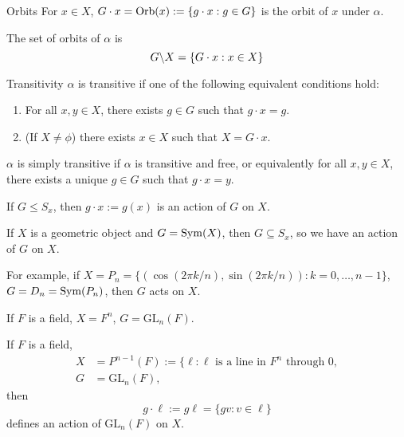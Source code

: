 \documentclass{article}
\begin{document}
\begin{definition}{Orbits}
    For $x\in X$, $G\cdot x = \operatorname{Orb}(x):=\{g\cdot x:g\in G\}$ is the orbit of $x$ under $\alpha$.
    \vspace{2mm}

    The set of orbits of $\alpha$ is
    \begin{equation*}
        G\text{\textbackslash} X = \{G\cdot x:x\in X\}
    \end{equation*}
\end{definition}
\begin{definition}{Transitivity}
    $\alpha$ is transitive if one of the following equivalent conditions hold:
    \begin{enumerate}
        \item For all $x,y\in X$, there exists $g\in G$ such that $g\cdot x=g$.
        \item (If $X \neq \phi$) there exists $x\in X$ such that $X=G\cdot x$.
    \end{enumerate}
    $\alpha$ is simply transitive if $\alpha$ is transitive and free, or equivalently for all $x,y\in X$, there exists a unique $g\in G$ such that $g\cdot x = y$.
\end{definition}
\begin{example}
    If $G\le S_x$, then $g\cdot x:= g(x)$ is an action of $G$ on $X$.
\end{example}
\begin{example}
    If $X$ is a geometric object and $G=\mathrm{Sym}(X)$, then $G \subseteq S_x$, so we have an action of $G$ on $X$.
    \vspace{2mm}

    For example, if $X=P_n=\{(\cos(2\pi k/n),\sin(2\pi k/n)):k=0,\dots,n-1\}$, $G=D_n=\mathrm{Sym}(P_n)$, then $G$ acts on $X$.
    \vspace{2mm}

    If $F$ is a field, $X=F^n$, $G=\text{GL}_n(F)$.
\end{example}
\begin{example}
    If $F$ is a field,
    \begin{align*}
        X & = P^{n-1}(F) := \{\ell : \ell \text{ is a line in $F^n$ through $0$}, \\
        G & = \text{GL}_n(F),
    \end{align*}
    then
    \begin{equation*}
        g\cdot \ell := g\ell = \{gv:v\in \ell\}
    \end{equation*}
    defines an action of $\text{GL}_n(F)$ on $X$.
\end{example}
\end{document}
